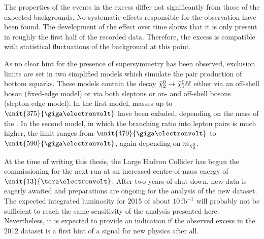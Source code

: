 The properties of the events in the excess differ not significantly from those of the expected backgrounds. No systematic effects responsible for the observation have been found. The development of the effect over time shows that it is only present in roughly the first half of the recorded data. Therefore, the excess is compatible with statistical fluctuations of the background at this point.

As no clear hint for the presence of supersymmetry has been observed, exclusion limits are set in two simplified models which simulate the pair production of bottom squarks. These models contain the decay ${\tilde{\chi}^0_2} \rightarrow {\tilde{\chi}^0_1} \ell\ell$ either via an off-shell \Z boson (fixed-edge model) or via both sleptons or on- and off-shell \Z bosons (slepton-edge model). In the first model, \sbottom masses up to $\unit{375}{\giga\electronvolt}$ have been exluded, depending on the mass of the \secondchi. In the second model, in which the branching ratio into lepton pairs is much higher, the limit ranges from $\unit{470}{\giga\electronvolt}$ to $\unit{590}{\giga\electronvolt}$, again depending on $m_{{\tilde{\chi}^0_2}}$. 

At the time of writing this thesis, the Large Hadron Collider has begun the commissioning for the next run at  an increased centre-of-mass energy of $\unit{13}{\tera\electronvolt}$. After two years of shut-down, new data is eagerly awaited and preparations are ongoing for the analysis of the new dataset. The expected integrated luminosity for 2015 of about $10\,\mathrm{fb}^{-1}$ will probably not be sufficient to reach the same sensitivity of the analysis presented here. Nevertheless, it is expected to provide an indication if the observed excess in the 2012 dataset is a first hint of a signal for new physics after all. 